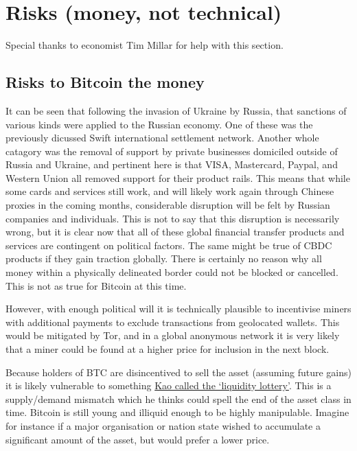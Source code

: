\section{Risks (money, not technical)}
Special thanks to economist Tim Millar for help with this section.
\subsection{Risks to Bitcoin the money}
It can be seen that following the invasion of Ukraine by Russia, that sanctions of various kinds were applied to the Russian economy. One of these was the previously dicussed Swift international settlement network. Another whole catagory was the removal of support by private businesses domiciled outside of Russia and Ukraine, and pertinent here is that VISA, Mastercard, Paypal, and Western Union all removed support for their product rails. This means that while some cards and services still work, and will likely work again through Chinese proxies in the coming months, considerable disruption will be felt by Russian companies and individuals. This is not to say that this disruption is necessarily wrong, but it is clear now that all of these global financial transfer products and services are contingent on political factors. The same might be true of CBDC products if they gain traction globally. There is certainly no reason why all money within a physically delineated border could not be blocked or cancelled. This is not as true for Bitcoin at this time. \par 
However, with enough political will it is technically plausible to incentivise miners with additional payments to exclude transactions from geolocated wallets. This would be mitigated by Tor, and in a global anonymous network it is very likely that a miner could be found at a higher price for inclusion in the next block. \par
Because holders of BTC are disincentived to sell the asset (assuming future gains) it is likely vulnerable to something \href{https://twitter.com/UrbanKaoboy/status/1526311908709502977}{Kao called the `liquidity lottery'}. This is a supply/demand mismatch which he thinks could spell the end of the asset class in time. Bitcoin is still young and illiquid enough to be highly manipulable. Imagine for instance if a major organisation or nation state wished to accumulate a significant amount of the asset, but would prefer a lower price. %
